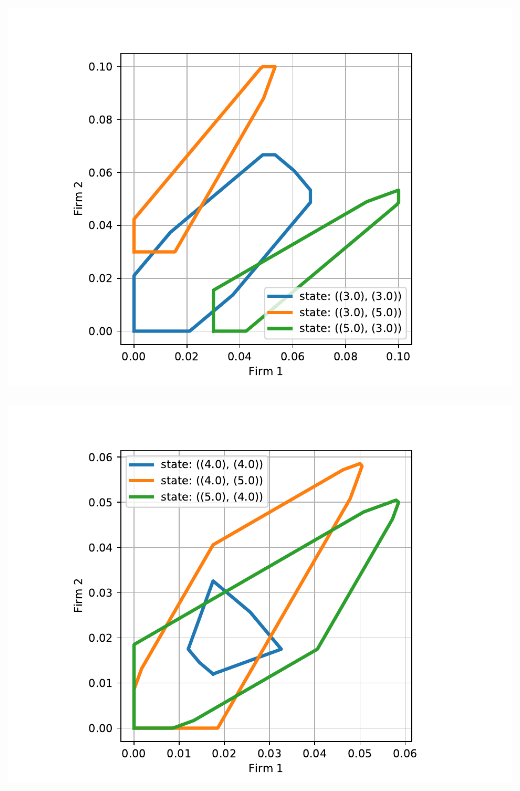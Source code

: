 \documentclass[11pt]{article}
\begin{document}
\includegraphics[width=.9\linewidth]{./img/overlap_21_23_33.pdf}

\includegraphics[width=.9\linewidth]{./img/overlap_28_29_34.pdf}
\end{document}
